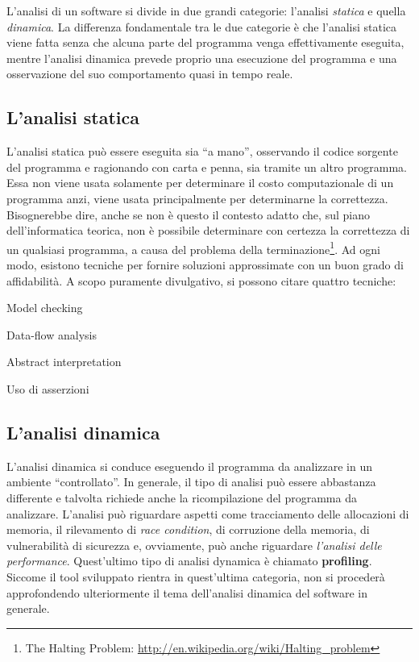 \documentclass[a4paper,11pt]{report}
\begin{document}
L'analisi di un software si divide in due grandi categorie: l'analisi \textit{statica} e quella \textit{dinamica}.
La differenza fondamentale tra le due categorie è che l'analisi statica viene fatta senza che alcuna parte del programma venga effettivamente eseguita, mentre l'analisi dinamica prevede proprio una esecuzione del programma e una osservazione del suo comportamento quasi in tempo reale. 

\subsection{L'analisi statica}
L'analisi statica può essere eseguita sia ``a mano'', osservando il codice sorgente del programma e ragionando con carta e penna, sia tramite un altro programma. Essa non viene usata solamente per determinare il costo computazionale di un programma anzi, viene usata principalmente per determinarne la correttezza. Bisognerebbe dire, anche se non è questo il contesto adatto che, sul piano dell'informatica teorica, non è possibile determinare con certezza la correttezza di un qualsiasi programma, a causa del problema della terminazione\footnote{The Halting Problem: \url{http://en.wikipedia.org/wiki/Halting_problem}}. Ad ogni modo, esistono tecniche per fornire soluzioni approssimate con un buon grado di affidabilità. A scopo puramente divulgativo, si possono citare quattro tecniche:

\begin{itemize*}
\item Model checking
\item Data-flow analysis
\item Abstract interpretation
\item Uso di asserzioni
\end{itemize*}

\subsection{L'analisi dinamica}
L'analisi dinamica si conduce eseguendo il programma da analizzare in un ambiente ``controllato''. In generale, il tipo di analisi può essere abbastanza differente e talvolta richiede anche la ricompilazione del programma da analizzare. L'analisi può riguardare aspetti come tracciamento delle allocazioni di memoria, il rilevamento di \textit{race condition}, di corruzione della memoria, di vulnerabilità di sicurezza e, ovviamente, può anche riguardare \textit{l'analisi delle performance}. Quest'ultimo tipo di analisi dynamica è chiamato \textbf{profiling}. Siccome il tool sviluppato rientra in quest'ultima categoria, non si procederà approfondendo ulteriormente il tema dell'analisi dinamica del software in generale.
\end{document}
